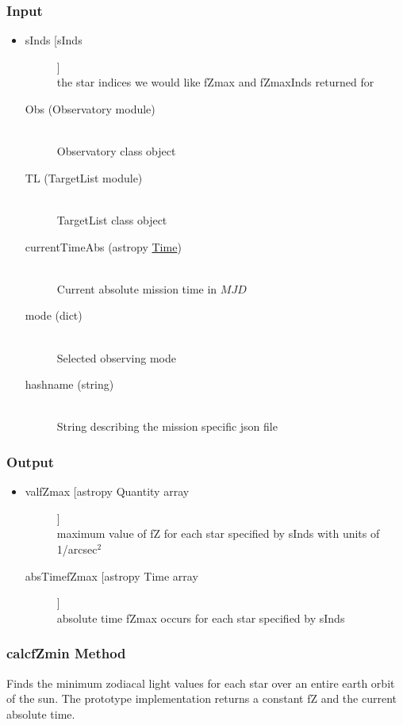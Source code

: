 \documentclass[cleanfoot]{asme2ej}
\begin{document}
\subsubsection*{Input}
\begin{itemize}
\item
\begin{description}
    \item[sInds [sInds]] \hfill \\ the star indices we would like fZmax and fZmaxInds returned for
    \item[Obs (Observatory module)] \hfill \\ Observatory class object
    \item[TL (TargetList module)] \hfill \\ TargetList class object
    \item[currentTimeAbs (astropy \href{http://astropy.readthedocs.org/en/latest/time/index.html}{Time})] \hfill \\ Current absolute mission time in $ MJD $
    \item[mode (dict)] \hfill \\ Selected observing mode
    \item[hashname (string)] \hfill \\ String describing the mission specific json file
\end{description}
\end{itemize}
\subsubsection*{Output}
\begin{itemize}
\item
\begin{description}
    \item[valfZmax [astropy Quantity array]] \hfill \\ maximum value of fZ for each star specified by sInds with units of 1/arcsec$^2$
    \item[absTimefZmax [astropy Time array]] \hfill \\ absolute time fZmax occurs for each star specified by sInds
\end{description}
\end{itemize}

\subsubsection{calcfZmin Method} \label{sec:calcfZmintask}
Finds the minimum zodiacal light values for each star over an entire earth orbit of the sun. The prototype implementation returns a constant fZ and the current absolute time.
\end{document}
